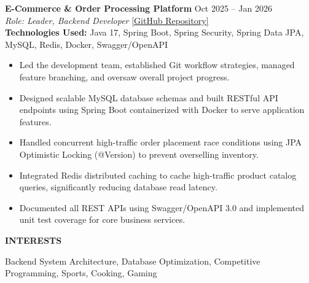 ﻿\documentclass[11pt,a4paper]{article}
\newcommand{\cvsection}[1]{%
  \vspace{7pt}%
  \noindent\textbf{\large #1}\par%
  \vspace{3pt}%
}
\begin{document}
\noindent
\textbf{E-Commerce \& Order Processing Platform} \hfill Oct 2025 -- Jan 2026 \\
\textit{Role: Leader, Backend Developer} \hfill \href{https://github.com/ng-doanh/ecommerce-api}{[GitHub Repository]} \\
\textbf{Technologies Used:} Java 17, Spring Boot, Spring Security, Spring Data JPA, MySQL, Redis, Docker, Swagger/OpenAPI
\begin{itemize}[leftmargin=1.5em, itemsep=2pt, topsep=2pt]
    \item Led the development team, established Git workflow strategies, managed feature branching, and oversaw overall project progress.
    \item Designed scalable MySQL database schemas and built RESTful API endpoints using Spring Boot containerized with Docker to serve application features.
    \item Handled concurrent high-traffic order placement race conditions using JPA Optimistic Locking (@Version) to prevent overselling inventory.
    \item Integrated Redis distributed caching to cache high-traffic product catalog queries, significantly reducing database read latency.
    \item Documented all REST APIs using Swagger/OpenAPI 3.0 and implemented unit test coverage for core business services.
\end{itemize}

\cvsection{INTERESTS}
Backend System Architecture, Database Optimization, Competitive Programming, Sports, Cooking, Gaming
\end{document}

